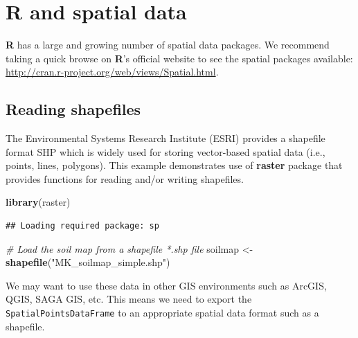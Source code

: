 \documentclass[10pt,b5paper,]{book}
\newenvironment{Shaded}{\begin{snugshade}}{\end{snugshade}}
\newcommand{\CommentTok}[1]{\textcolor[rgb]{0.56,0.35,0.01}{\textit{#1}}}
\newcommand{\DataTypeTok}[1]{\textcolor[rgb]{0.13,0.29,0.53}{#1}}
\newcommand{\KeywordTok}[1]{\textcolor[rgb]{0.13,0.29,0.53}{\textbf{#1}}}
\newcommand{\NormalTok}[1]{#1}
\newcommand{\OperatorTok}[1]{\textcolor[rgb]{0.81,0.36,0.00}{\textbf{#1}}}
\newcommand{\OtherTok}[1]{\textcolor[rgb]{0.56,0.35,0.01}{#1}}
\newcommand{\StringTok}[1]{\textcolor[rgb]{0.31,0.60,0.02}{#1}}
\theoremstyle{definition}
\theoremstyle{definition}
\theoremstyle{definition}
\theoremstyle{remark}
\begin{document}
\hypertarget{r-and-spatial-data}{%
\section{R and spatial data}\label{r-and-spatial-data}}

\textbf{R} has a large and growing number of spatial data packages. We
recommend taking a quick browse on \textbf{R}'s official website to see
the spatial packages available:
\url{http://cran.r-project.org/web/views/Spatial.html}.

\hypertarget{reading-shapefiles}{%
\subsection{Reading shapefiles}\label{reading-shapefiles}}

The Environmental Systems Research Institute (ESRI) provides a shapefile
format SHP which is widely used for storing vector-based spatial data
(i.e., points, lines, polygons). This example demonstrates use of
\textbf{raster} package that provides functions for reading and/or
writing shapefiles.

\begin{Shaded}
\begin{Highlighting}[]
\KeywordTok{library}\NormalTok{(raster)}
\end{Highlighting}
\end{Shaded}

\begin{verbatim}
## Loading required package: sp
\end{verbatim}

\begin{Shaded}
\begin{Highlighting}[]
\CommentTok{# Load the soil map from a shapefile *.shp file}
\NormalTok{soilmap <-}\StringTok{ }\KeywordTok{shapefile}\NormalTok{(}\StringTok{"MK_soilmap_simple.shp"}\NormalTok{)}
\end{Highlighting}
\end{Shaded}

We may want to use these data in other GIS environments such as ArcGIS,
QGIS, SAGA GIS, etc. This means we need to export the
\texttt{SpatialPointsDataFrame} to an appropriate spatial data format
such as a shapefile.

\begin{Shaded}
\end{Shaded}
\end{document}
